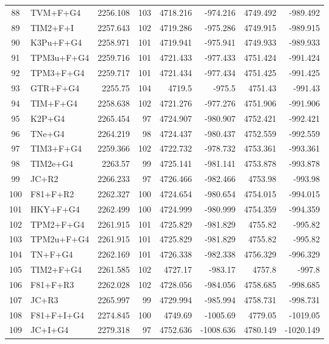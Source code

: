 \documentclass[12pt]{article}
\begin{document}
\begin{longtable}{clrrrrrr}
	88 & TVM+F+G4 & 2256.108 & 103 & 4718.216 & -974.216 & 4749.492 & -989.492 \\ 
	89 & TIM2+F+I & 2257.643 & 102 & 4719.286 & -975.286 & 4749.915 & -989.915 \\ 
	90 & K3Pu+F+G4 & 2258.971 & 101 & 4719.941 & -975.941 & 4749.933 & -989.933 \\ 
	91 & TPM3u+F+G4 & 2259.716 & 101 & 4721.433 & -977.433 & 4751.424 & -991.424 \\ 
	92 & TPM3+F+G4 & 2259.717 & 101 & 4721.434 & -977.434 & 4751.425 & -991.425 \\ 
	93 & GTR+F+G4 & 2255.75 & 104 & 4719.5 & -975.5 & 4751.43 & -991.43 \\ 
	94 & TIM+F+G4 & 2258.638 & 102 & 4721.276 & -977.276 & 4751.906 & -991.906 \\ 
	95 & K2P+G4 & 2265.454 & 97 & 4724.907 & -980.907 & 4752.421 & -992.421 \\ 
	96 & TNe+G4 & 2264.219 & 98 & 4724.437 & -980.437 & 4752.559 & -992.559 \\ 
	97 & TIM3+F+G4 & 2259.366 & 102 & 4722.732 & -978.732 & 4753.361 & -993.361 \\ 
	98 & TIM2e+G4 & 2263.57 & 99 & 4725.141 & -981.141 & 4753.878 & -993.878 \\ 
	99 & JC+R2 & 2266.233 & 97 & 4726.466 & -982.466 & 4753.98 & -993.98 \\ 
	100 & F81+F+R2 & 2262.327 & 100 & 4724.654 & -980.654 & 4754.015 & -994.015 \\ 
	101 & HKY+F+G4 & 2262.499 & 100 & 4724.999 & -980.999 & 4754.359 & -994.359 \\ 
	102 & TPM2+F+G4 & 2261.915 & 101 & 4725.829 & -981.829 & 4755.82 & -995.82 \\ 
	103 & TPM2u+F+G4 & 2261.915 & 101 & 4725.829 & -981.829 & 4755.82 & -995.82 \\ 
	104 & TN+F+G4 & 2262.169 & 101 & 4726.338 & -982.338 & 4756.329 & -996.329 \\ 
	105 & TIM2+F+G4 & 2261.585 & 102 & 4727.17 & -983.17 & 4757.8 & -997.8 \\ 
	106 & F81+F+R3 & 2262.028 & 102 & 4728.056 & -984.056 & 4758.685 & -998.685 \\ 
	107 & JC+R3 & 2265.997 & 99 & 4729.994 & -985.994 & 4758.731 & -998.731 \\ 
	108 & F81+F+I+G4 & 2274.845 & 100 & 4749.69 & -1005.69 & 4779.05 & -1019.05 \\ 
	109 & JC+I+G4 & 2279.318 & 97 & 4752.636 & -1008.636 & 4780.149 & -1020.149 \\ 

\end{longtable}
\end{document}
